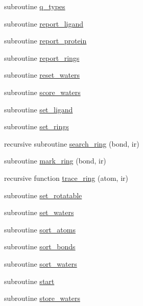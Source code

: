 \begin{DoxyCompactItemize}
\item 
subroutine \hyperlink{classcalc__chemscore_a2e6ad5279a8abd4f97d64943f783bc61}{q\-\_\-types}
\item 
subroutine \hyperlink{classcalc__chemscore_a01a080b62749ee18b509448a22380c13}{report\-\_\-ligand}
\item 
subroutine \hyperlink{classcalc__chemscore_af79fd6a521299e01b74e8d9ec1c113fe}{report\-\_\-protein}
\item 
subroutine \hyperlink{classcalc__chemscore_a96f372948049119e39d151b115758321}{report\-\_\-rings}
\item 
subroutine \hyperlink{classcalc__chemscore_a8b10ac4feeec194f53ba62db0a28cd6c}{reset\-\_\-waters}
\item 
subroutine \hyperlink{classcalc__chemscore_acdc0c2f07cc5b0046e6fa9acf7cbfa20}{score\-\_\-waters}
\item 
subroutine \hyperlink{classcalc__chemscore_a1a0ba4ea42a592ed4c0017e204372e0b}{set\-\_\-ligand}
\item 
subroutine \hyperlink{classcalc__chemscore_ace212f3ac54af67d6c9b4219bcfe2f54}{set\-\_\-rings}
\item 
recursive subroutine \hyperlink{classcalc__chemscore_a52f0eaac7653260916cc115ae99209b1}{search\-\_\-ring} (bond, ir)
\item 
subroutine \hyperlink{classcalc__chemscore_a414b73e7646faa655654d38f811747f4}{mark\-\_\-ring} (bond, ir)
\item 
recursive function \hyperlink{classcalc__chemscore_abfb55febeb0d91f6e19fc431c096e3d8}{trace\-\_\-ring} (atom, ir)
\item 
subroutine \hyperlink{classcalc__chemscore_a83a9746853c3430bcb4548f1e5c88b90}{set\-\_\-rotatable}
\item 
subroutine \hyperlink{classcalc__chemscore_a81ef9a983f650189ae781ea35f2d2699}{set\-\_\-waters}
\item 
subroutine \hyperlink{classcalc__chemscore_a5612ee8ef3d2f944d4d10d6fd62e86f0}{sort\-\_\-atoms}
\item 
subroutine \hyperlink{classcalc__chemscore_a02f4a93c7e3a6a2621b7574617ce0775}{sort\-\_\-bonds}
\item 
subroutine \hyperlink{classcalc__chemscore_a340ee3d9ab3aefb6311490a3780ba4c8}{sort\-\_\-waters}
\item 
subroutine \hyperlink{classcalc__chemscore_af43d8e5ae35fc5fd588eae032d48cb51}{start}
\item 
subroutine \hyperlink{classcalc__chemscore_a9ee63e29d215e66459adea3d67c95cfc}{store\-\_\-waters}

\end{DoxyCompactItemize}
